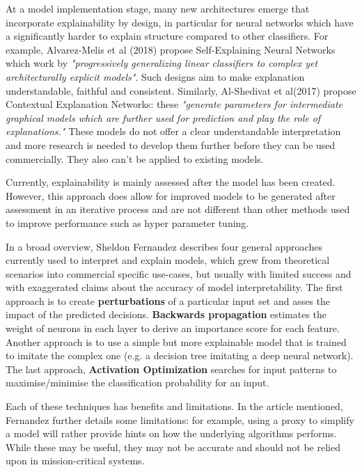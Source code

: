 \documentclass[proposal]{softeng}
\begin{document}
At a model implementation stage, many new architectures emerge that incorporate explainability by design, in particular for neural networks which have a significantly harder to explain structure compared to other classifiers. For example, Alvarez-Melis et al (2018)\cite{alvarezmelis2018robust} propose Self-Explaining Neural Networks which work by \textit{"progressively generalizing linear classifiers to complex yet architecturally explicit models"}. Such designs aim to make explanation understandable, faithful and consistent. Similarly, Al-Shedivat et al(2017)\cite{alshedivat2017contextual} propose Contextual Explanation Networks: these \textit{"generate parameters for intermediate graphical models which are further used for prediction and play the role of explanations."} These models do not offer a clear understandable interpretation and more research is needed to develop them further before they can be used commercially. They also can't be applied to existing models.

Currently, explainability is mainly assessed after the model has been created. However, this approach does allow for improved models to be generated after assessment in an iterative process and are not different than other methods used to improve performance such as hyper parameter tuning. 

In a broad overview, Sheldon Fernandez \cite{fernandez-dark-ai} describes four general approaches currently used to interpret and explain models, which grew from theoretical scenarios into commercial specific use-cases, but usually with limited success and with exaggerated claims about the accuracy of model interpretability. The first approach is to create \textbf{perturbations} of a particular input set and asses the impact of the predicted decisions. \textbf{Backwards propagation} estimates the weight of neurons in each layer to derive an importance score for each feature. Another approach is to use a simple but more explainable model that is trained to imitate the complex one (e.g. a decision tree imitating a deep neural network). The last approach, \textbf{Activation Optimization} searches for input patterns to maximise/minimise the classification probability for an input.

Each of these techniques has benefits and limitations. In the article mentioned, Fernandez further details some limitations: for example, using a proxy to simplify a model will rather provide hints on how the underlying algorithms performs. While these may be useful, they may not be accurate and should not be relied upon in mission-critical systems.
\end{document}
